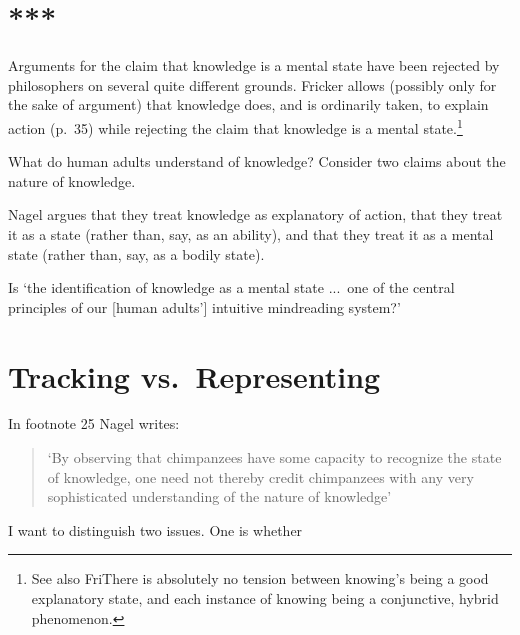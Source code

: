 \documentclass[11pt,a4paper]{extarticle}
\begin{document}
\section{***}
Arguments for the claim that knowledge is a mental state have been rejected by philosophers on several quite different grounds.
Fricker allows (possibly only for the sake of argument) that knowledge does, and is ordinarily taken, to explain action (p.\ 35) while rejecting the claim that knowledge is a mental state.\footnote{
See also FriThere is absolutely no tension between knowing's being a good explanatory state, and each instance of knowing being a conjunctive, hybrid phenomenon. 
}
%

What do human adults understand of knowledge?
Consider two claims about the nature of knowledge.



Nagel argues that they treat knowledge as explanatory of action, that they treat it as a state (rather than, say, as an ability), and that they treat it as a mental state (rather than, say, as a bodily state).
 

Is `the identification of knowledge as a mental state ...\ one of the central principles of our [human adults'] intuitive mindreading system?'




\section{Tracking vs.\ Representing}




In footnote 25 Nagel writes:
%
\begin{quote}
`By observing that chimpanzees have some capacity to recognize the state of knowledge, one need not thereby credit chimpanzees with any very sophisticated understanding of the nature of knowledge'
\end{quote}
%
I want to distinguish two issues.
One is whether 





\end{document}
